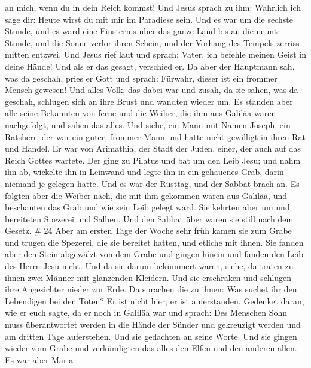 an mich, wenn du in dein Reich kommst!  Und Jesus sprach zu
ihm: Wahrlich ich sage dir: Heute wirst du mit mir im Paradiese sein.
 Und es war um die sechste Stunde, und es ward eine
Finsternis über das ganze Land bis an die neunte Stunde, 
und die Sonne verlor ihren Schein, und der Vorhang des Tempels zerriss
mitten entzwei.  Und Jesus rief laut und sprach: Vater, ich
befehle meinen Geist in deine Hände! Und als er das gesagt, verschied
er.  Da aber der Hauptmann sah, was da geschah, pries er
Gott und sprach: Fürwahr, dieser ist ein frommer Mensch gewesen!
 Und alles Volk, das dabei war und zusah, da sie sahen, was
da geschah, schlugen sich an ihre Brust und wandten wieder um.
 Es standen aber alle seine Bekannten von ferne und die
Weiber, die ihm aus Galiläa waren nachgefolgt, und sahen das alles.
 Und siehe, ein Mann mit Namen Joseph, ein Ratsherr, der
war ein guter, frommer Mann  und hatte nicht gewilligt in
ihren Rat und Handel. Er war von Arimathia, der Stadt der Juden, einer,
der auch auf das Reich Gottes wartete.  Der ging zu Pilatus
und bat um den Leib Jesu;  und nahm ihn ab, wickelte ihn in
Leinwand und legte ihn in ein gehauenes Grab, darin niemand je gelegen
hatte.  Und es war der Rüsttag, und der Sabbat brach an.
 Es folgten aber die Weiber nach, die mit ihm gekommen
waren aus Galiläa, und beschauten das Grab und wie sein Leib gelegt
ward.  Sie kehrten aber um und bereiteten Spezerei und
Salben. Und den Sabbat über waren sie still nach dem Gesetz. \# 24
 Aber am ersten Tage der Woche sehr früh kamen sie zum Grabe
und trugen die Spezerei, die sie bereitet hatten, und etliche mit ihnen.
 Sie fanden aber den Stein abgewälzt von dem Grabe
 und gingen hinein und fanden den Leib des Herrn Jesu nicht.
 Und da sie darum bekümmert waren, siehe, da traten zu ihnen
zwei Männer mit glänzenden Kleidern.  Und sie erschraken und
schlugen ihre Angesichter nieder zur Erde. Da sprachen die zu ihnen: Was
suchet ihr den Lebendigen bei den Toten?  Er ist nicht hier;
er ist auferstanden. Gedenket daran, wie er euch sagte, da er noch in
Galiläa war  und sprach: Des Menschen Sohn muss
überantwortet werden in die Hände der Sünder und gekreuzigt werden und
am dritten Tage auferstehen.  Und sie gedachten an seine
Worte.  Und sie gingen wieder vom Grabe und verkündigten das
alles den Elfen und den anderen allen.  Es war aber Maria
